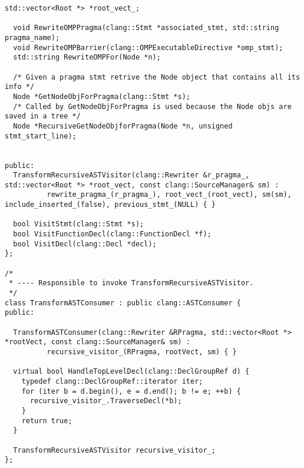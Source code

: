 \documentclass[a4paper,11pt,twoside]{book}
\begin{document}
\begin{lstlisting}[language=CCC, caption=driver/program.h]
  std::vector<Root *> *root_vect_;

  void RewriteOMPPragma(clang::Stmt *associated_stmt, std::string pragma_name);
  void RewriteOMPBarrier(clang::OMPExecutableDirective *omp_stmt);
  std::string RewriteOMPFor(Node *n);
  
  /* Given a pragma stmt retrive the Node object that contains all its info */
  Node *GetNodeObjForPragma(clang::Stmt *s);
  /* Called by GetNodeObjForPragma is used because the Node objs are saved in a tree */
  Node *RecursiveGetNodeObjforPragma(Node *n, unsigned stmt_start_line);


public:
  TransformRecursiveASTVisitor(clang::Rewriter &r_pragma_, std::vector<Root *> *root_vect, const clang::SourceManager& sm) : 
          rewrite_pragma_(r_pragma_), root_vect_(root_vect), sm(sm), include_inserted_(false), previous_stmt_(NULL) { }
  
  bool VisitStmt(clang::Stmt *s);
  bool VisitFunctionDecl(clang::FunctionDecl *f);
  bool VisitDecl(clang::Decl *decl);
};

/*
 * ---- Responsible to invoke TransformRecursiveASTVisitor.
 */
class TransformASTConsumer : public clang::ASTConsumer { 
public:

  TransformASTConsumer(clang::Rewriter &RPragma, std::vector<Root *> *rootVect, const clang::SourceManager& sm) : 
          recursive_visitor_(RPragma, rootVect, sm) { }
  
  virtual bool HandleTopLevelDecl(clang::DeclGroupRef d) {
    typedef clang::DeclGroupRef::iterator iter;
    for (iter b = d.begin(), e = d.end(); b != e; ++b) {
      recursive_visitor_.TraverseDecl(*b);
    } 
    return true; 
  }

  TransformRecursiveASTVisitor recursive_visitor_;
};
\end{lstlisting}
\end{document}
